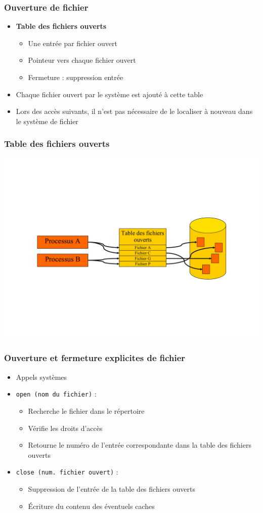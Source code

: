 \begin{frame}
\frametitle{Ouverture de fichier}
\begin{itemize}
\item \textbf{Table des fichiers ouverts}
\begin{itemize}
\item Une entrée par fichier ouvert
\item Pointeur vers chaque fichier ouvert
\item Fermeture : suppression entrée
\end{itemize}
\item Chaque fichier ouvert par le système est ajouté à cette table
\item Lors des accès suivants, il n'est pas nécessaire de le localiser à nouveau dans le système de fichier
\end{itemize}
\end{frame}

\begin{frame}
\frametitle{Table des fichiers ouverts}
\includegraphics[width=\textwidth]{../illustration/table_fichiers_ouverts.pdf}
\end{frame}

\begin{frame}
\frametitle{Ouverture et fermeture explicites de fichier}
\begin{itemize}
\item Appels systèmes
\item \texttt{open (nom du fichier)} :
\begin{itemize}
\item Recherche le fichier dans le répertoire
\item Vérifie les droits d'accès
\item Retourne le numéro de l'entrée correspondante dans la table des fichiers ouverts
\end{itemize}
\item \texttt{close (num. fichier ouvert)} :
\begin{itemize}
\item Suppression de l'entrée de la table des fichiers ouverts
\item Écriture du contenu des éventuels caches
\end{itemize}
\end{itemize}
\end{frame}

